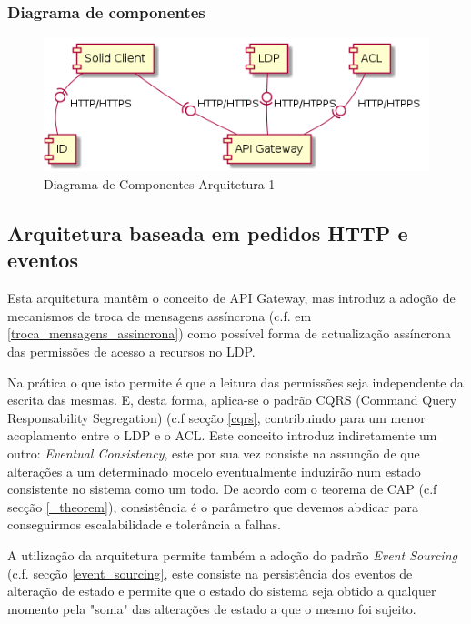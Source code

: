 \subsubsection{Diagrama de componentes}
\begin{figure}[h]
    \begin{center}
    \includegraphics[width=1 \textwidth]{figures/component_diagram_2.png}
    \caption{Diagrama de Componentes Arquitetura 1}
    \end{center}
\end{figure}
\pagebreak

\subsection{Arquitetura baseada em pedidos HTTP e eventos} \label{subsection:arquitetura_2}

Esta arquitetura mantêm o conceito de API Gateway, mas introduz a adoção de mecanismos de troca de mensagens assíncrona (c.f. em \ref{troca_mensagens_assincrona}) como possível forma de actualização assíncrona das permissões de acesso a recursos no LDP.

Na prática o que isto permite é que a leitura das permissões seja independente da escrita das mesmas. E, desta forma, aplica-se o padrão CQRS (Command Query Responsability Segregation) (c.f secção \ref{cqrs}, contribuindo para um menor acoplamento entre o LDP e o ACL. Este conceito introduz indiretamente um outro: \emph{Eventual Consistency}, este por sua vez consiste na assunção de que alterações a um determinado modelo eventualmente induzirão num estado consistente no sistema como um todo. De acordo com o teorema de CAP (c.f secção \ref{_theorem}), consistência é o parâmetro que devemos abdicar para conseguirmos escalabilidade e tolerância a falhas.

A utilização da arquitetura permite também a adoção do padrão \emph{Event Sourcing} (c.f. secção \ref{event_sourcing}, este consiste na persistência dos eventos de alteração de estado e permite que o estado do sistema seja obtido a qualquer momento pela "soma" das alterações de estado a que o mesmo foi sujeito.


